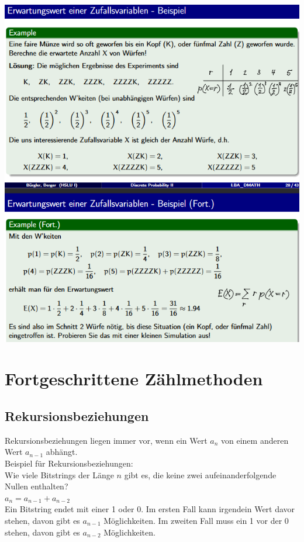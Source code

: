 \documentclass[12pt]{scrartcl}
\begin{document}
\includegraphics[width=14cm]{img/erwartungswert_zufallsvariable2.png}

\newpage
\section{Fortgeschrittene Zählmethoden}
\subsection{Rekursionsbeziehungen}
Rekursionsbeziehungen liegen immer vor, wenn ein Wert $a_n$ von einem anderen Wert $a_{n-1}$ abhängt.\\
Beispiel für Rekursionsbeziehungen:\\
Wie viele Bitstrings der Länge $n$ gibt es, die keine zwei aufeinanderfolgende
Nullen enthalten?\\

$a_n = a_{n-1} + a_{n-2}$\\

Ein Bitstring endet mit einer 1 oder 0. Im ersten Fall kann irgendein Wert davor stehen, davon
gibt es $a_{n-1}$ Möglichkeiten. Im zweiten Fall muss ein 1 vor der 0 stehen, davon gibt es $a_{n-2}$ Möglichkeiten.\\
\end{document}
